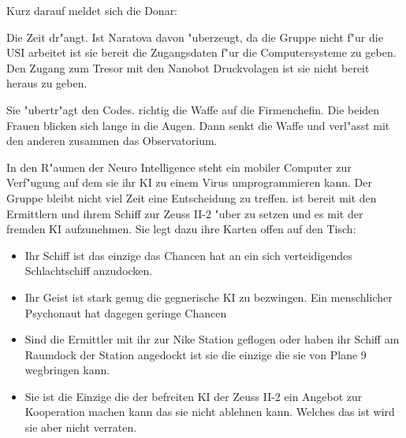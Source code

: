 
Kurz darauf meldet sich die Donar:


Die Zeit dr"angt. Ist Naratova davon "uberzeugt, da\3 die Gruppe nicht f"ur die USI arbeitet ist sie bereit \ml{} die Zugangsdaten f"ur die Computersysteme zu geben. Den Zugang zum Tresor mit den Nanobot Druckvolagen ist sie nicht bereit heraus zu geben.


Sie "ubertr"agt \ml{} den Codes. \xl{} richtig die Waffe auf die Firmenchefin. Die beiden Frauen blicken sich lange in die Augen. Dann senkt \xl{} die Waffe und verl"asst mit den anderen zusammen das Observatorium.

In den R"aumen der Neuro Intelligence steht \ml{} ein mobiler Computer zur Verf"ugung auf dem sie ihr KI zu einem Virus umprogrammieren kann. Der Gruppe bleibt nicht viel Zeit eine Entscheidung zu treffen. \xl{} ist bereit mit den Ermittlern und ihrem Schiff zur Zeuss II-2 "uber zu setzen und es mit der fremden KI aufzunehmen. Sie legt dazu ihre Karten offen auf den Tisch:

\begin{itemize}
	\item Ihr Schiff ist das einzige das Chancen hat an ein sich verteidigendes Schlachtschiff anzudocken.
	\item Ihr Geist ist stark genug die gegnerische KI zu bezwingen. Ein menschlicher Psychonaut hat dagegen geringe Chancen
	\item Sind die Ermittler mit ihr zur Nike Station geflogen oder haben ihr Schiff am Raumdock der Station angedockt ist sie die einzige 
		die sie von Plane 9 wegbringen kann.
	\item Sie ist die Einzige die der befreiten KI der Zeuss II-2 ein Angebot zur Kooperation machen kann das sie nicht ablehnen kann. 
		Welches das ist wird sie aber nicht verraten.
\end{itemize}

